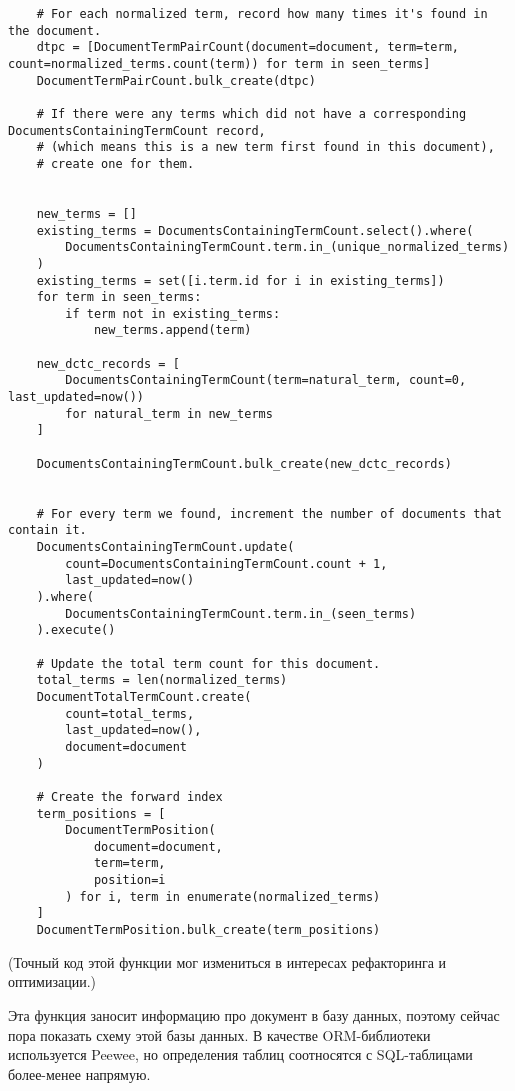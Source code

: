 \documentclass[a4page]{article}
\begin{document}
\begin{verbatim}
    # For each normalized term, record how many times it's found in the document.
    dtpc = [DocumentTermPairCount(document=document, term=term, count=normalized_terms.count(term)) for term in seen_terms]
    DocumentTermPairCount.bulk_create(dtpc)

    # If there were any terms which did not have a corresponding DocumentsContainingTermCount record,
    # (which means this is a new term first found in this document),
    # create one for them.

    
    new_terms = []
    existing_terms = DocumentsContainingTermCount.select().where(
        DocumentsContainingTermCount.term.in_(unique_normalized_terms)
    )
    existing_terms = set([i.term.id for i in existing_terms])
    for term in seen_terms:
        if term not in existing_terms:
            new_terms.append(term)

    new_dctc_records = [
        DocumentsContainingTermCount(term=natural_term, count=0, last_updated=now())
        for natural_term in new_terms
    ]

    DocumentsContainingTermCount.bulk_create(new_dctc_records)


    # For every term we found, increment the number of documents that contain it.
    DocumentsContainingTermCount.update(
        count=DocumentsContainingTermCount.count + 1,
        last_updated=now()
    ).where(
        DocumentsContainingTermCount.term.in_(seen_terms)
    ).execute()

    # Update the total term count for this document.
    total_terms = len(normalized_terms)
    DocumentTotalTermCount.create(
        count=total_terms,
        last_updated=now(),
        document=document
    )

    # Create the forward index
    term_positions = [
        DocumentTermPosition(
            document=document,
            term=term,
            position=i
        ) for i, term in enumerate(normalized_terms)
    ]
    DocumentTermPosition.bulk_create(term_positions)
\end{verbatim}

(Точный код этой функции мог измениться в интересах рефакторинга и оптимизации.)

Эта функция заносит информацию про документ в базу данных, поэтому сейчас пора показать схему этой базы данных. В качестве ORM-библиотеки используется Peewee, но определения таблиц соотносятся с SQL-таблицами более-менее напрямую.
\end{document}
